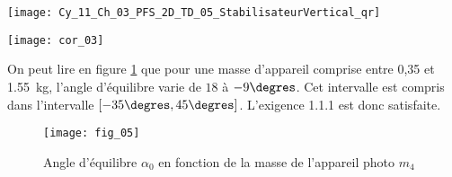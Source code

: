 \ifprof
\else
\begin{marginfigure}
\centering
\texttt{[image: Cy\_11\_Ch\_03\_PFS\_2D\_TD\_05\_StabilisateurVertical\_qr]}
\end{marginfigure}
\fi



\ifprof
\else
\ifcolle \else
{}
\fi\fi

\ifprof
\begin{marginfigure}
\texttt{[image: cor\_03]}
\end{marginfigure}
\begin{corrige} 

On peut lire en figure \ref{Cy_11_Ch_03_PFS_2D_TD_05_fig_05} que pour une masse d'appareil comprise entre 0,35 et \SI{1,55}{kg}, l'angle d'équilibre varie de $18$ à $-9\degres$. Cet intervalle est compris dans l'intervalle $\left[-35\degres,45\degres\right]$. L'exigence 1.1.1 est donc satisfaite.
\end{corrige}
\else
\fi

\ifprof
\else

\begin{figure}[!h]
\texttt{[image: fig\_05]}
\caption{Angle d’équilibre $\alpha_0$ en fonction de la masse de l’appareil photo $m_4$}
\label{Cy_11_Ch_03_PFS_2D_TD_05_fig_05}
\end{figure}

\fi

